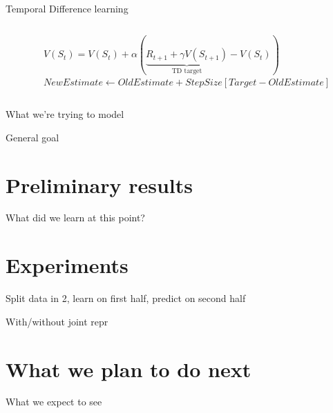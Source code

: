 \documentclass[bigger]{beamer}
\begin{document}
\begin{frame}[label={sec:org16423ef}]{Temporal Difference learning}
\begin{columns}
\begin{column}{0.5\columnwidth}
\end{column}
\begin{column}{0.5\columnwidth}
\begin{adjustbox}{max width=\columnwidth, keepaspectratio}
$V(S_t) = V(S_t) + \alpha(\underbrace{R_{t+1} + \gamma V(S_{t+1})}_\text{TD target} - V(S_t))$
\end{adjustbox}\\[1em]
\begin{adjustbox}{max width=\columnwidth, keepaspectratio}
$NewEstimate \leftarrow OldEstimate + StepSize[Target - OldEstimate]$
\end{adjustbox}
\end{column}
\end{columns}
\end{frame}
\begin{frame}[label={sec:orgd937368}]{What we're trying to model}
\end{frame}
\begin{frame}[label={sec:org171b9c9}]{General goal}
\end{frame}
\section{Preliminary results}
\label{sec:org9b3b1e7}
\begin{frame}[label={sec:org04f5d8b}]{What did we learn at this point?}
\end{frame}
\section{Experiments}
\label{sec:org4d32dac}
\begin{frame}[label={sec:orge3ad803}]{Split data in 2, learn on first half, predict on second half}
\end{frame}
\begin{frame}[label={sec:org4514429}]{With/without joint repr}
\end{frame}
\section{What we plan to do next}
\label{sec:org238e928}
\begin{frame}[label={sec:org6388b9f}]{What we expect to see}
\end{frame}
\end{document}
